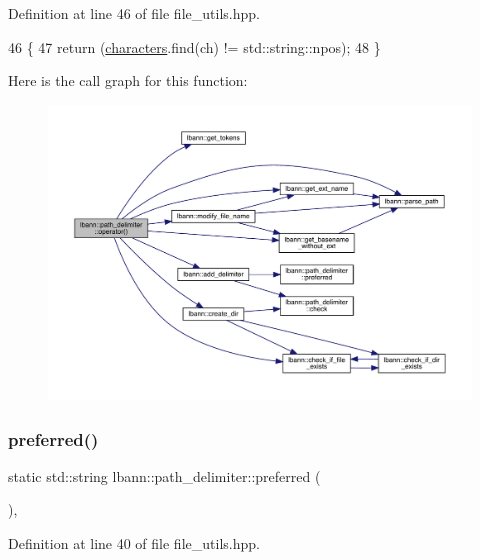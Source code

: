 Definition at line 46 of file file\+\_\+utils.\+hpp.


\begin{DoxyCode}
46                                        \{
47     \textcolor{keywordflow}{return} (\hyperlink{structlbann_1_1path__delimiter_ac64e71aff928b202c0c9e880ea641315}{characters}.find(ch) != std::string::npos);
48   \}
\end{DoxyCode}
Here is the call graph for this function\+:\nopagebreak
\begin{figure}[H]
\begin{center}
\leavevmode
\includegraphics[width=350pt]{structlbann_1_1path__delimiter_a89e287e7a7c4b4fc2863da116f199a71_cgraph}
\end{center}
\end{figure}
\mbox{\label{structlbann_1_1path__delimiter_a4f3bb346e47a66b16419125b1485e2ef}} 
\subsubsection{\texorpdfstring{preferred()}{preferred()}}
{\footnotesize\ttfamily static std\+::string lbann\+::path\+\_\+delimiter\+::preferred (\begin{DoxyParamCaption}{ }\end{DoxyParamCaption})\hspace{0.3cm}{\ttfamily [inline]}, {\ttfamily [static]}}



Definition at line 40 of file file\+\_\+utils.\+hpp.


